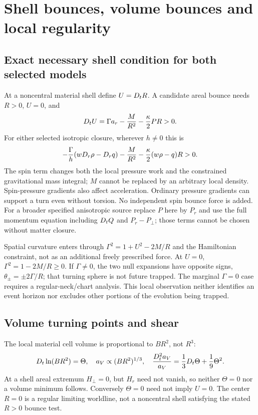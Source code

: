\section{Shell bounces, volume bounces and local regularity}
\subsection{Exact necessary shell condition for both selected models}
At a noncentral material shell define $U=D_t R$. A candidate areal bounce needs $R>0$, $U=0$, and
\begin{equation}\label{eq:shellbounce}
 D_t U=\Gamma a_r-\frac{M}{R^2}-\frac{\kappa}2 PR>0.
\end{equation}
For either selected isotropic closure, wherever $h\ne0$ this is
\begin{equation}
 -\frac{\Gamma}{h}(wD_r\rho-D_r q)-\frac{M}{R^2}
 -\frac{\kappa}2(w\rho-q)R>0.
\end{equation}
The spin term changes both the local pressure work and the constrained gravitational mass integral; $M$ cannot be replaced by an arbitrary local density. Spin-pressure gradients also affect acceleration. Ordinary pressure gradients can support a turn even without torsion. No independent spin bounce force is added. For a broader specified anisotropic source replace $P$ here by $P_r$ and use the full momentum equation including $D_t Q$ and $P_r-P_\perp$; those terms cannot be chosen without matter closure.

Spatial curvature enters through $\Gamma^2=1+U^2-2M/R$ and the Hamiltonian constraint, not as an additional freely prescribed force. At $U=0$, $\Gamma^2=1-2M/R\geq0$. If $\Gamma\ne0$, the two null expansions have opposite signs, $\theta_\pm=\pm2\Gamma/R$; that turning sphere is not future trapped. The marginal $\Gamma=0$ case requires a regular-neck/chart analysis. This local observation neither identifies an event horizon nor excludes other portions of the evolution being trapped.

\subsection{Volume turning points and shear}
The local material cell volume is proportional to $BR^2$, not $R^3$:
\begin{equation}
 D_t\ln(BR^2)=\Theta,\quad a_V\propto(BR^2)^{1/3},\quad
 \frac{D_t^2a_V}{a_V}=\frac13D_t\Theta+\frac19\Theta^2.
\end{equation}
At a shell areal extremum $H_\perp=0$, but $H_r$ need not vanish, so neither $\Theta=0$ nor a volume minimum follows. Conversely $\Theta=0$ need not imply $U=0$. The center $R=0$ is a regular limiting worldline, not a noncentral shell satisfying the stated $R>0$ bounce test.

